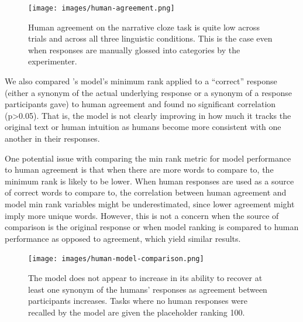 \documentclass[10pt,a4paper]{article}
\begin{document}
\begin{figure}
 \centering
 \texttt{[image: images/human-agreement.png]}
 \caption{Human agreement on the narrative cloze task is quite low across trials and across all three linguistic conditions. This is the case even when responses are manually glossed into categories by the experimenter.}
 \label{fig:human-agreement}
\end{figure}

We also compared 's model's minimum rank applied to a ``correct'' response (either a synonym of the actual underlying response or a synonym of a response participants gave) to human agreement and found no significant correlation (p>0.05). That is, the model is not clearly improving in how much it tracks the original text or human intuition as humans become more consistent with one another in their responses.

One potential issue with comparing the min rank metric for model performance to human agreement is that when there are more words to compare to, the minimum rank is likely to be lower. When human responses are used as a source of correct words to compare to, the correlation between human agreement and model min rank variables might be underestimated, since lower agreement might imply more unique words. However, this is not a concern when the source of comparison is the original response or when model ranking is compared to human performance as opposed to agreement, which yield similar results.

% 
% 
% 
% 
% 

\begin{figure}
 \centering
 \texttt{[image: images/human-model-comparison.png]}
 \caption{The model does not appear to increase in its ability to recover at least one synonym of the humans' responses as agreement between participants increases. Tasks where no human responses were recalled by the model are given the placeholder ranking 100.}
 \label{fig:human-model-comparison}
\end{figure}
\end{document}
